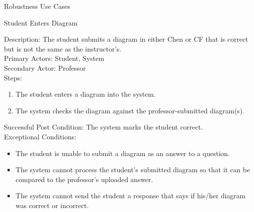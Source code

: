 \documentclass{article}
\begin{document}
\begin{section}{Robustness Use Cases}
    \begin{subsection}{Student Enters Diagram}
     
    Description: The student submits a diagram in either Chen or CF that is correct but is not the same as the instructor’s.\\
    Primary Actors: Student, System\\
    Secondary Actor: Professor\\
    Steps:
    \begin{enumerate}
    \item The student enters a diagram into the system.
    \item The system checks the diagram against the professor-submitted diagram(s).
    \end{enumerate}
    
     Successful Post Condition: 
    The system marks the student correct.\\
    Exceptional Conditions:
        \begin{itemize}
            \item The student is unable to submit a diagram as an answer to a question.
            \item The system cannot process the student’s submitted diagram so that it can be compared to the professor’s uploaded answer.
            \item The system cannot send the student a response that says if his/her diagram was correct or incorrect.
            \end{itemize}
    \end{subsection}
    

\end{section}
\end{document}
